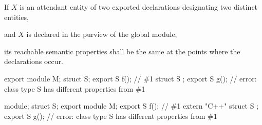 \begin{std.txt}
  \alinea
  If $X$ is an attendant entity of two exported declarations
  designating two distinct entities,
  \begin{after}\color{addclr}
  and $X$ is declared in the purview of the global module,
  \end{after}
  its reachable semantic properties shall
  be the same at the points where the declarations occur.
  \begin{before}\color{addclr}
  \begin{example}
    \begin{codeblock}
      export module M;
      struct S;
      export S f();     // \#1
      struct S { };
      export S g();     // error: class type S has different properties from \#1
    \end{codeblock}
  \end{example}
  \end{before}
  
  \begin{after}\color{addclr}
  \begin{example}
    \begin{codeblock}
      module;
      struct S;
      export module M;
      export S f();     // \#1
      extern "C++" struct S { };
      export S g();     // error: class type S has different properties from \#1
    \end{codeblock}
  \end{example}
  \end{after}
\end{std.txt}
